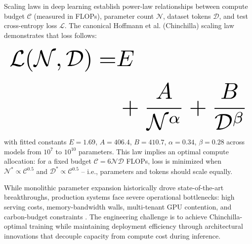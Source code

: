 \documentclass[10pt,twocolumn,letterpaper]{article}
\begin{document}
Scaling laws in deep learning establish power-law relationships between compute budget $\mathcal{C}$ (measured in FLOPs), parameter count $\mathcal{N}$, dataset tokens $\mathcal{D}$, and test cross-entropy loss $\mathcal{L}$. The canonical Hoffmann et al. (Chinchilla) scaling law demonstrates that loss follows:























\begin{equation}
\resizebox{\columnwidth}{!}{$\displaystyle
\begin{aligned}
\mathcal{L}(\mathcal{N}, \mathcal{D}) = & E \\
& + \frac{A}{\mathcal{N}^\alpha} + \frac{B}{\mathcal{D}^\beta}
\end{aligned}
$}
\end{equation}























with fitted constants $E = 1.69$, $A = 406.4$, $B = 410.7$, $\alpha = 0.34$, $\beta = 0.28$ across models from $10^7$ to $10^{10}$ parameters. This law implies an optimal compute allocation: for a fixed budget $\mathcal{C} = 6\mathcal{N}\mathcal{D}$ FLOPs, loss is minimized when $\mathcal{N}^* \propto \mathcal{C}^{0.5}$ and $\mathcal{D}^* \propto \mathcal{C}^{0.5}$ -- i.e., parameters and tokens should scale equally.

While monolithic parameter expansion historically drove state-of-the-art breakthroughs, production systems face severe operational bottlenecks: high serving costs, memory-bandwidth walls, multi-tenant GPU contention, and carbon-budget constraints \cite{arxiv_2406_00584,crossref_10_1109_access_2026_3656309}. The engineering challenge is to achieve Chinchilla-optimal training while maintaining deployment efficiency through architectural innovations that decouple capacity from compute cost during inference.
\end{document}
